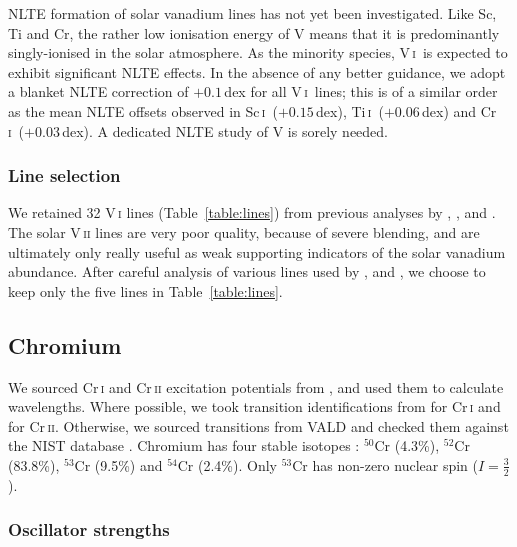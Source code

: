 \documentclass[traditabstract]{aa}
\newcommand{\altsci}{Sc\,\textsc{i}}
\newcommand{\alttii}{Ti\,\textsc{i}}
\newcommand{\altvi}{V\,\textsc{i}}
\newcommand{\altcri}{Cr\,\textsc{i}}
\newcommand{\scani}{\altsci\ }
\newcommand{\tii}{\alttii\ }
\newcommand{\vi}{\altvi\ }
\newcommand{\cri}{\altcri\ }
\begin{document}
NLTE formation of solar vanadium lines has not yet been investigated.  Like Sc, Ti and Cr, the rather low ionisation energy of V means that it is predominantly singly-ionised in the solar atmosphere.  As the minority species, \vi is expected to exhibit significant NLTE effects.  In the absence of any better guidance, we adopt a blanket NLTE correction of $+0.1$\,dex for all \vi lines; this is of a similar order as the mean NLTE offsets observed in \scani ($+0.15$\,dex), \tii ($+0.06$\,dex) and \cri ($+0.03$\,dex).  A dedicated NLTE study of V is sorely needed.

\subsubsection{Line selection}
\label{Vlineselection}

We retained 32 V\,\textsc{i} lines (Table~\ref{table:lines}) from previous analyses by \citet{Biemont78b}, \citet{Whaling85}, \citet{Reddy03} and \citet{McWilliam94}. The solar V\,\textsc{ii} lines are very poor quality, because of severe blending, and are ultimately only really useful as weak supporting indicators of the solar vanadium abundance.  After careful analysis of various lines used by \cite{Youssef89}, \citet{Biemont89} and \citet{McWilliam95}, we choose to keep only the five lines in Table~\ref{table:lines}.

\subsection{Chromium}
\label{Cratomicdata}

We sourced Cr\,\textsc{i} and Cr\,\textsc{ii} excitation potentials from \citet{Sugar85}, and used them to calculate
wavelengths.  
Where possible, we took transition identifications from \citet{Sobeck07} for Cr\,\textsc{i} and \citet{Nilsson06} for Cr\,\textsc{ii}.  Otherwise, we sourced transitions from VALD and checked them against the NIST database \citep{NIST}.  Chromium has four stable isotopes \citep{IUPAC98}: $^{50}$Cr (4.3\%), $^{52}$Cr (83.8\%), $^{53}$Cr (9.5\%) and $^{54}$Cr (2.4\%).  Only $^{53}$Cr has non-zero nuclear spin ($I=\frac{3}{2}$).

\subsubsection{Oscillator strengths}
\label{Crgfs}
\end{document}
